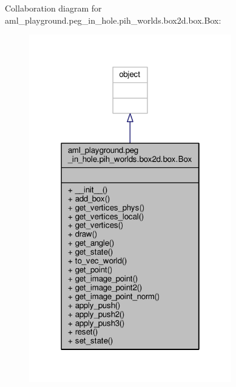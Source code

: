 Collaboration diagram for aml\-\_\-playground.\-peg\-\_\-in\-\_\-hole.\-pih\-\_\-worlds.\-box2d.\-box.\-Box\-:\nopagebreak
\begin{figure}[H]
\begin{center}
\leavevmode
\includegraphics[width=250pt]{classaml__playground_1_1peg__in__hole_1_1pih__worlds_1_1box2d_1_1box_1_1_box__coll__graph}
\end{center}
\end{figure}
